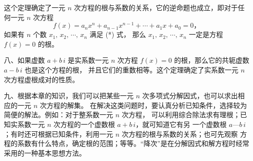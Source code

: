 这个定理确定了一元 $n$ 次方程的根与系数的关系，它的逆命题也成立，即对于任何一元 $n$ 次方程
$$ f(x) = a_n x^n + a_{n-1}x^{n-1} + \cdots + a_1x + a_0 = 0 \text{，} $$
如果有 $n$ 个数 $x_1,\, x_2,\, \cdots,\, x_n$ 满足 (*) 式，
那么 $x_1,\, x_2,\, \cdots,\, x_n$ 一定是方程 $f(x) = 0$ 的根。


八、如果虚数 $a + b\,i$ 是实系数一元 $n$ 次方程 $f(x) = 0$ 的根，那么它的共轭虚数 $a - b\,i$
也是这个方程的根， 并且它们的重数相等。这个定理确定了实系数一元 $n$ 次方程虚根成对的性质。

九、根据本章的知识，我们可以把某些一元 $n$ 次多项式分解因式，也可以求出相应的一元 $n$ 次方程的解集。
在解决这类问题时，要认真分析已知条件，选择较为简便的解法。例如：对于整系数一元 $n$ 次方程，
可以利用综合除法求有理根；已知实系数一元 $n$ 次方程的一个虚数根 $a + b\,i$，就可知道它有另
一个虚数根 $a — b\,i$；有时还可根据已知条件，利用一元 $n$ 次方程的根与系数的关系；也可先观察
方程的系数有什么特点，确定根的范围；等等。“降次”是在分解因式和解方程时经常采用的一种基本思想方法。

